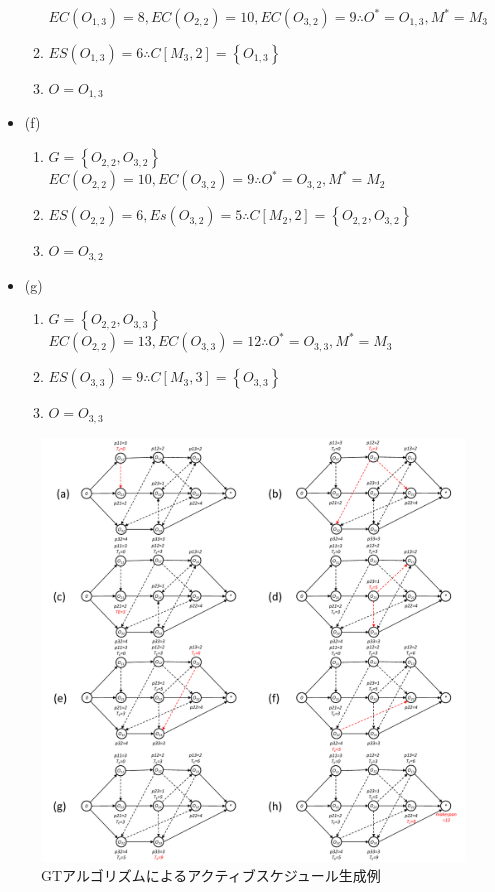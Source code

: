 \documentclass{jsarticle}
\begin{document}
\begin{itemize}
\begin{enumerate}
			$EC(O_{1,3})=8,EC(O_{2,2})=10,EC(O_{3,2})=9 \therefore
			O^*=O_{1,3}, M^*=M_3$
		\item $ES(O_{1,3})=6 \therefore C[M_3,2]=\left\{ O_{1,3} \right\}$
		\item $O=O_{1,3}$
	\end{enumerate}
	\item (f)
	\begin{enumerate}
		\item $G=\left\{ O_{2,2},O_{3,2} \right\}$ \\
			$EC(O_{2,2})=10,EC(O_{3,2})=9 \therefore O^*=O_{3,2}, M^*=M_2$
		\item $ES(O_{2,2})=6,Es(O_{3,2})=5 \therefore C[M_2,2]=\left\{ O_{2,2},O_{3,2} \right\}$
		\item $O=O_{3,2}$
	\end{enumerate}
	\item (g)
	\begin{enumerate}
		\item $G=\left\{ O_{2,2},O_{3,3} \right\}$ \\
			$EC(O_{2,2})=13,EC(O_{3,3})=12 \therefore O^*=O_{3,3},M^*=M_3$
		\item $ES(O_{3,3})=9 \therefore C[M_3,3]=\left\{ O_{3,3} \right\}$
		\item $O=O_{3,3}$
	\end{enumerate}
\end{itemize}

\begin{figure}[H]
	\centering
	\includegraphics[scale=0.8]{figures/GT.pdf}
	\caption{GTアルゴリズムによるアクティブスケジュール生成例}
	\label{fig:GT}
\end{figure}
\end{document}
